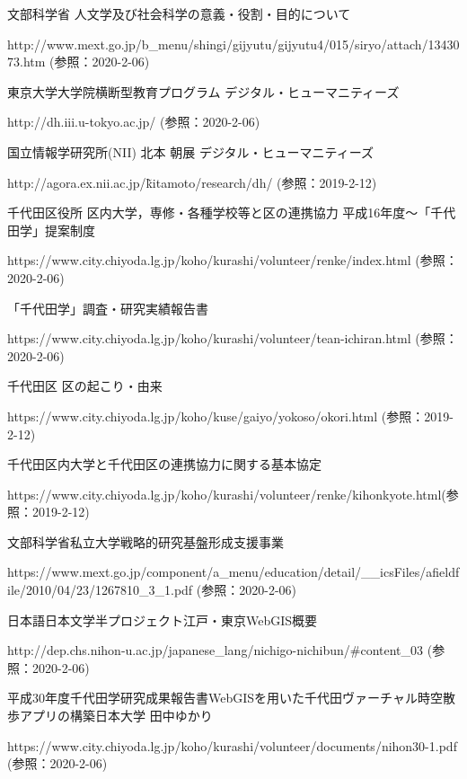 \documentclass[a4paper, twoside]{jarticle}
\begin{document}
\vspace{1cm}
\begin{thebibliography}{99}

文部科学省 人文学及び社会科学の意義・役割・目的について\par
http://www.mext.go.jp/b\_menu/shingi/gijyutu/gijyutu4/015/siryo/attach/1343073.htm (参照：2020-2-06)

東京大学大学院横断型教育プログラム デジタル・ヒューマニティーズ\par
http://dh.iii.u-tokyo.ac.jp/ (参照：2020-2-06)

国立情報学研究所(NII) 北本 朝展 デジタル・ヒューマニティーズ\par
http://agora.ex.nii.ac.jp/\~kitamoto/research/dh/ (参照：2019-2-12)

千代田区役所 区内大学，専修・各種学校等と区の連携協力 平成16年度〜「千代田学」提案制度\par
https://www.city.chiyoda.lg.jp/koho/kurashi/volunteer/renke/index.html (参照：2020-2-06)

「千代田学」調査・研究実績報告書\par
https://www.city.chiyoda.lg.jp/koho/kurashi/volunteer/tean-ichiran.html (参照：2020-2-06)

千代田区 区の起こり・由来\par
https://www.city.chiyoda.lg.jp/koho/kuse/gaiyo/yokoso/okori.html (参照：2019-2-12)

千代田区内大学と千代田区の連携協力に関する基本協定\par
https://www.city.chiyoda.lg.jp/koho/kurashi/volunteer/renke/kihonkyote.html(参照：2019-2-12)

文部科学省私立大学戦略的研究基盤形成支援事業\par
https://www.mext.go.jp/component/a\_menu/education/detail/\_\_icsFiles/afieldfile/2010/04/23/1267810\_3\_1.pdf (参照：2020-2-06)

日本語日本文学半プロジェクト江戸・東京WebGIS概要\par
http://dep.chs.nihon-u.ac.jp/japanese\_lang/nichigo-nichibun/\#content\_03 (参照：2020-2-06)

平成30年度千代田学研究成果報告書WebGISを用いた千代田ヴァーチャル時空散歩アプリの構築日本大学 田中ゆかり\par
https://www.city.chiyoda.lg.jp/koho/kurashi/volunteer/documents/nihon30-1.pdf (参照：2020-2-06)


\end{thebibliography}
\end{document}
